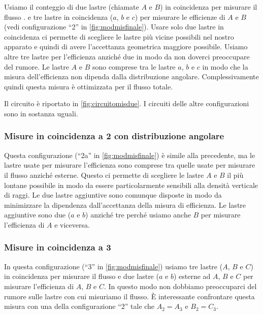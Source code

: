 Usiamo il conteggio di due lastre (chiamate $A$ e $B$) in coincidenza per misurare il flusso
.
e tre lastre in coincidenza ($a$, $b$ e $c$) per misurare le efficienze di $A$ e $B$
(vedi configurazione ``2'' in \autoref{fig:modmisfinale}).
Usare solo due lastre in coincidenza ci permette di scegliere le lastre più vicine possibili nel nostro apparato
e quindi di avere l'accettanza geometrica maggiore possibile.
Usiamo altre tre lastre per l'efficienza anziché due in modo da non doverci preoccupare del rumore.
Le lastre $A$ e $B$ sono comprese tra le lastre $a$, $b$ e $c$
in modo che la misura dell'efficienza non dipenda dalla distribuzione angolare.
Complessivamente quindi questa misura è ottimizzata per il flusso totale.

Il circuito è riportato in \autoref{fig:circuitomisdue}.
I circuiti delle altre configurazioni sono in sostanza uguali.

\subsubsection{Misure in coincidenza a 2 con distribuzione angolare}

Questa configurazione (``2a'' in \autoref{fig:modmisfinale}) è simile alla precedente,
ma le lastre usate per misurare l'efficienza sono comprese tra quelle usate per misurare il flusso anziché esterne.
Questo ci permette di scegliere le lastre $A$ e $B$ il più lontane possibile
in modo da essere particolarmente sensibili alla densità verticale di raggi.
Le due lastre aggiuntive sono comunque disposte in modo da minimizzare
la dipendenza dall'accettanza della misura di efficienza.
Le lastre aggiuntive sono due ($a$ e $b$) anziché tre
perché usiamo anche $B$ per misurare l'efficienza di $A$ e viceversa.

\subsubsection{Misure in coincidenza a 3}

In questa configurazione (``3'' in \autoref{fig:modmisfinale})
usiamo tre lastre ($A$, $B$ e $C$) in coincidenza per misurare il flusso
e due lastre ($a$ e $b$) esterne ad $A$, $B$ e $C$ per misurare l'efficienza di $A$, $B$ e $C$.
In questo modo non dobbiamo preoccuparci del rumore sulle lastre con cui misuriamo il flusso.
È interessante confrontare questa misura con una della configurazione ``2'' tale che $A_2=A_3$ e $B_2=C_3$.

